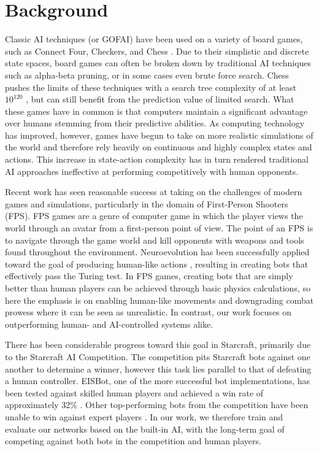 \documentclass[10pt,a4paper,twocolumn]{article}
\begin{document}
\section{Background}
\label{sec:back}

Classic AI techniques (or GOFAI) have been used on a variety of board games, such as Connect Four, Checkers, and Chess \cite{Allis94searchingfor}. Due to their simplistic and discrete state spaces, board games can often be broken down by traditional AI techniques such as alpha-beta pruning, or in some cases even brute force search. Chess pushes the limits of these techniques with a search tree complexity of at least $10^{120}$ \cite{Shannon:1988:PCP:61701.67002}, but can still benefit from the prediction value of limited search. What these games have in common is that computers maintain a significant advantage over humans stemming from their predictive abilities. As computing technology has improved, however, games have begun to take on more realistic simulations of the world and therefore rely heavily on continuous and highly complex states and actions. This increase in state-action complexity has in turn rendered traditional AI approaches ineffective at performing competitively with human opponents.

Recent work has seen reasonable success at taking on the challenges of modern games and simulations, particularly in the domain of First-Person Shooters (FPS). FPS games are a genre of computer game in which the player views the world through an avatar from a first-person point of view. The point of an FPS is to navigate through the game world and kill opponents with weapons and tools found throughout the environment. Neuroevolution has been successfully applied toward the goal of producing human-like actions \cite{schrum:cig11competition}, resulting in creating bots that effectively pass the Turing test. In FPS games, creating bots that are simply better than human players can be achieved through basic physics calculations, so here the emphasis is on enabling human-like movements and downgrading combat prowess where it can be seen as unrealistic. In contrast, our work focuses on outperforming human- and AI-controlled systems alike.

There has been considerable progress toward this goal in Starcraft, primarily due to the Starcraft AI Competition. The competition pits Starcraft bots against one another to determine a winner, however this task lies parallel to that of defeating a human controller. EISBot, one of the more successful bot implementations, has been tested against skilled human players and achieved a win rate of approximately 32\% \cite{weber2011building}. Other top-performing bots from the competition have been unable to win against expert players \cite{ai_comp_2010_website}. In our work, we therefore train and evaluate our networks based on the built-in AI, with the long-term goal of competing against both bots in the competition and human players.
\end{document}

